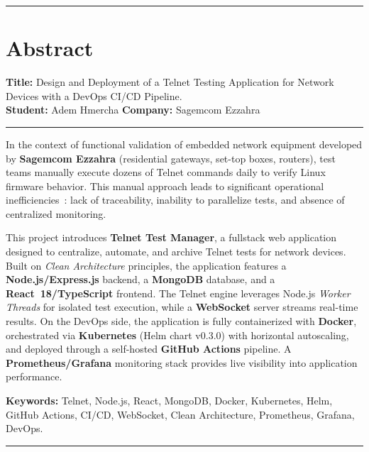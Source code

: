 \vspace{0.8cm}
\noindent\rule{\textwidth}{0.4pt}

\vspace{0.8cm}

\chapter*{Abstract}

\noindent\textbf{Title:} Design and Deployment of a Telnet Testing Application
for Network Devices with a DevOps CI/CD Pipeline.\\[0.2cm]
\noindent\textbf{Student:} Adem Hmercha \hfill
\textbf{Company:} Sagemcom Ezzahra\\[0.3cm]
\noindent\rule{\textwidth}{0.4pt}
\vspace{0.3cm}

\noindent In the context of functional validation of embedded network equipment
developed by \textbf{Sagemcom Ezzahra} (residential gateways, set-top boxes,
routers), test teams manually execute dozens of Telnet commands daily to verify
Linux firmware behavior. This manual approach leads to significant operational
inefficiencies~: lack of traceability, inability to parallelize tests, and
absence of centralized monitoring.

This project introduces \textbf{Telnet Test Manager}, a fullstack web application
designed to centralize, automate, and archive Telnet tests for network devices.
Built on \textit{Clean Architecture} principles, the application features a
\textbf{Node.js/Express.js} backend, a \textbf{MongoDB} database, and a
\textbf{React~18/TypeScript} frontend. The Telnet engine leverages Node.js
\textit{Worker Threads} for isolated test execution, while a \textbf{WebSocket}
server streams real-time results. On the DevOps side, the application is fully
containerized with \textbf{Docker}, orchestrated via \textbf{Kubernetes}
(Helm chart v0.3.0) with horizontal autoscaling, and deployed through a
self-hosted \textbf{GitHub Actions} pipeline. A \textbf{Prometheus/Grafana}
monitoring stack provides live visibility into application performance.

\vspace{0.3cm}
\noindent\textbf{Keywords:} Telnet, Node.js, React, MongoDB, Docker, Kubernetes,
Helm, GitHub Actions, CI/CD, WebSocket, Clean Architecture, Prometheus, Grafana,
DevOps.

\vspace{0.8cm}
\noindent\rule{\textwidth}{0.4pt}
\vspace{0.5cm}

